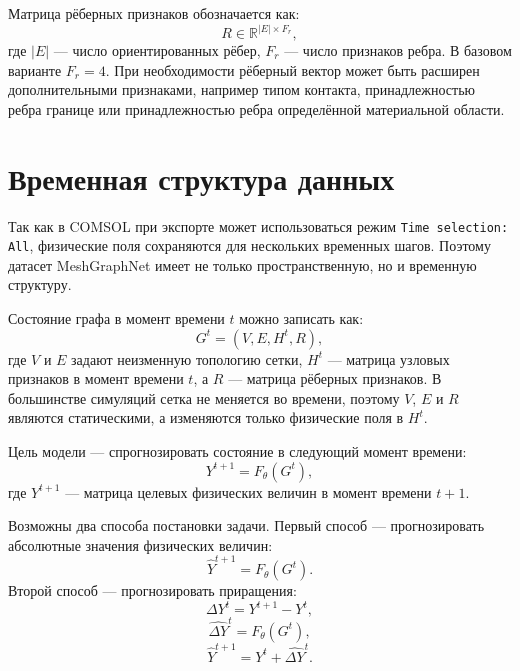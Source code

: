 Матрица рёберных признаков обозначается как:
\begin{equation}
    R \in \mathbb{R}^{|E| \times F_r},
\end{equation}
где $|E|$ --- число ориентированных рёбер, $F_r$ --- число признаков ребра. В базовом варианте $F_r=4$. При необходимости рёберный вектор может быть расширен дополнительными признаками, например типом контакта, принадлежностью ребра границе или принадлежностью ребра определённой материальной области.

\section{Временная структура данных}

Так как в COMSOL при экспорте может использоваться режим \texttt{Time selection: All}, физические поля сохраняются для нескольких временных шагов. Поэтому датасет MeshGraphNet имеет не только пространственную, но и временную структуру.

Состояние графа в момент времени $t$ можно записать как:
\begin{equation}
    G^t=(V,E,H^t,R),
\end{equation}
где $V$ и $E$ задают неизменную топологию сетки, $H^t$ --- матрица узловых признаков в момент времени $t$, а $R$ --- матрица рёберных признаков. В большинстве симуляций сетка не меняется во времени, поэтому $V$, $E$ и $R$ являются статическими, а изменяются только физические поля в $H^t$.

Цель модели --- спрогнозировать состояние в следующий момент времени:
\begin{equation}
    Y^{t+1}=F_{\theta}(G^t),
\end{equation}
где $Y^{t+1}$ --- матрица целевых физических величин в момент времени $t+1$.

Возможны два способа постановки задачи. Первый способ --- прогнозировать абсолютные значения физических величин:
\begin{equation}
    \hat{Y}^{t+1}=F_{\theta}(G^t).
\end{equation}
Второй способ --- прогнозировать приращения:
\begin{equation}
    \Delta Y^t=Y^{t+1}-Y^t,
\end{equation}
\begin{equation}
    \widehat{\Delta Y}^t=F_{\theta}(G^t),
\end{equation}
\begin{equation}
    \hat{Y}^{t+1}=Y^t+\widehat{\Delta Y}^t.
\end{equation}

